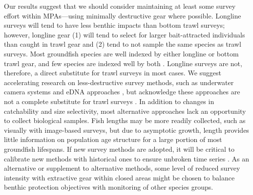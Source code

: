 \documentclass[12pt]{article}
\begin{document}
Our results suggest that we should consider maintaining at least some survey effort within MPAs---using minimally destructive gear where possible.
Longline surveys will tend to have less benthic impacts than bottom trawl surveys; however, longline gear (1) will tend to select for larger bait-attracted individuals than caught in trawl gear and (2) tend to not sample the same species as trawl surveys.
Most groundfish species are well indexed by either longline or bottom trawl gear, and few species are indexed well by both \citep[e.g.,][]{anderson2019synopsis}.
Longline surveys are not, therefore, a direct substitute for trawl surveys in most cases.
We suggest accelerating research on less-destructive survey methods, such as underwater camera systems
\citep[e.g.,][]{trenkel2004, rooper2012, bryan2023} and eDNA approaches \citep[e.g.,][]{rourke2022, he2023}, but acknowledge these approaches are not a complete substitute for trawl surveys \citep{benoit2020national}.
In addition to changes in catchability and size selectivity, most alternative approaches lack an opportunity to collect biological samples.
Fish lengths may be more readily collected, such as visually with image-based surveys, but due to asymptotic growth, length provides little information on population age structure for a large portion of most groundfish lifespans.
If new survey methods are adopted, it will be critical to calibrate new methods with historical ones to ensure unbroken time series \citep{field2006}.
As an alternative or supplement to alternative methods, some level of reduced survey intensity with extractive gear within closed areas might be chosen to balance benthic protection objectives with monitoring of other species groups.
\end{document}
